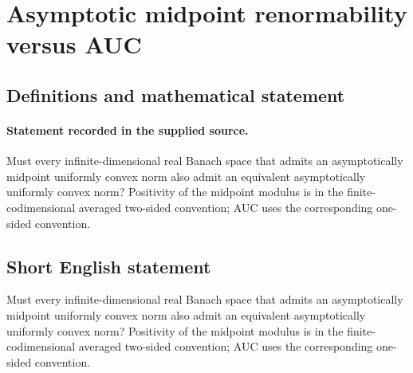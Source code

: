 \documentclass[11pt]{article}
\begin{document}
\section*{Asymptotic midpoint renormability versus AUC}\label{statement}
\subsection{Definitions and mathematical statement}
\paragraph{Statement recorded in the supplied source.}
Must every infinite-dimensional real Banach space that admits an asymptotically midpoint uniformly convex norm also admit an equivalent asymptotically uniformly convex norm? Positivity of the midpoint modulus is in the finite-codimensional averaged two-sided convention; AUC uses the corresponding one-sided convention.
\subsection{Short English statement}
Must every infinite-dimensional real Banach space that admits an asymptotically midpoint uniformly convex norm also admit an equivalent asymptotically uniformly convex norm? Positivity of the midpoint modulus is in the finite-codimensional averaged two-sided convention; AUC uses the corresponding one-sided convention.
\end{document}

